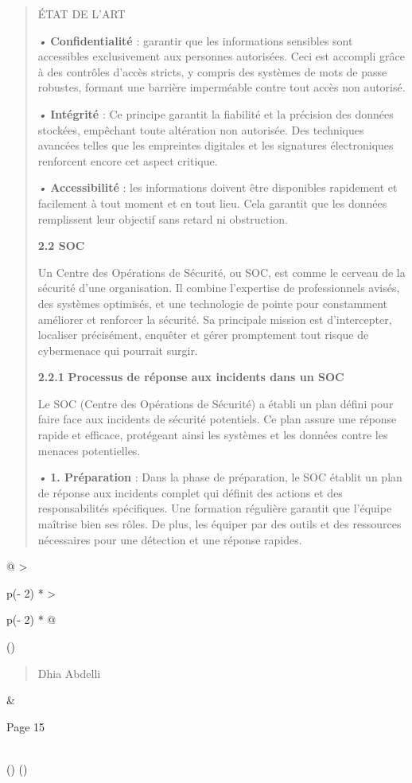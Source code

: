 \documentclass[
]{article}
\begin{document}
\begin{quote}
ÉTAT DE L'ART

\emph{•} \textbf{Confidentialité} : garantir que les informations
sensibles sont accessibles exclusivement aux personnes autorisées. Ceci
est accompli grâce à des contrôles d'accès stricts, y compris des
systèmes de mots de passe robustes, formant une barrière imperméable
contre tout accès non autorisé.

\emph{•} \textbf{Intégrité} : Ce principe garantit la fiabilité et la
précision des données stockées, empêchant toute altération non
autorisée. Des techniques avancées telles que les empreintes digitales
et les signatures électroniques renforcent encore cet aspect critique.

\emph{•} \textbf{Accessibilité} : les informations doivent être
disponibles rapidement et facilement à tout moment et en tout lieu. Cela
garantit que les données remplissent leur objectif sans retard ni
obstruction.

\textbf{2.2 SOC}

Un Centre des Opérations de Sécurité, ou SOC, est comme le cerveau de la
sécurité d'une organisation. Il combine l'expertise de professionnels
avisés, des systèmes optimisés, et une technologie de pointe pour
constamment améliorer et renforcer la sécurité. Sa principale mission
est d'intercepter, localiser précisément, enquêter et gérer promptement
tout risque de cybermenace qui pourrait surgir.

\textbf{2.2.1} \textbf{Processus de réponse aux incidents dans un SOC}

Le SOC (Centre des Opérations de Sécurité) a établi un plan défini pour
faire face aux incidents de sécurité potentiels. Ce plan assure une
réponse rapide et efficace, protégeant ainsi les systèmes et les données
contre les menaces potentielles.

\emph{•} \textbf{1. Préparation} : Dans la phase de préparation, le SOC
établit un plan de réponse aux incidents complet qui définit des actions
et des responsabilités spécifiques. Une formation régulière garantit que
l'équipe maîtrise bien ses rôles. De plus, les équiper par des outils et
des ressources nécessaires pour une détection et une réponse rapides.
\end{quote}

\begin{longtable}[]{@{}
  >{\raggedright\arraybackslash}p{(\columnwidth - 2\tabcolsep) * }
  >{\raggedright\arraybackslash}p{(\columnwidth - 2\tabcolsep) * }@{}}
\toprule()
\begin{minipage}[b]{\linewidth}\raggedright
\begin{quote}
Dhia Abdelli
\end{quote}
\end{minipage} & \begin{minipage}[b]{\linewidth}\raggedright
Page 15
\end{minipage} \\
\midrule()
\endhead
\bottomrule()
\end{longtable}
\end{document}
